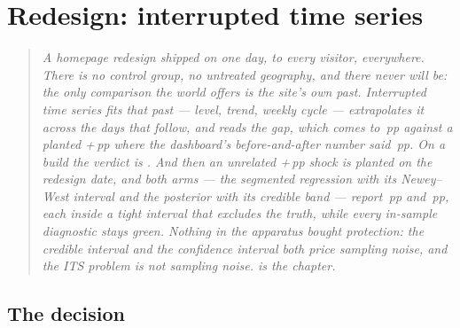 %
\providecommand{\pp}[1]{\mbox{#1\,pp}}

\chapter{Redesign: interrupted time series}
\label{ch:its}

\begin{quote}\small
\emph{A homepage redesign shipped on one day, to every visitor, everywhere. There is no control
group, no untreated geography, and there never will be: the only comparison the world offers is
the site's own past. Interrupted time series fits that past --- level, trend, weekly cycle ---
extrapolates it across the \nbTenNPost{} days that follow, and reads the gap, which comes to
\pp{\nbTenBayesAvg} against a planted \pp{+\nbTenTrueLift} where the dashboard's before-and-after
number said \pp{\nbTenNaive}. On a \eur{\nbTenCost} build the verdict is \nbTenPersVerdictnodecay{}.
And then an unrelated \pp{+\nbTenShock} shock is planted on the redesign date, and both arms ---
the segmented regression with its Newey--West interval and the posterior with its credible band ---
report \pp{\nbTenShockCls} and \pp{\nbTenShockBayes}, each inside a tight interval that
\emph{excludes} the truth, while every in-sample diagnostic stays green. Nothing in the apparatus
bought protection: the credible interval and the confidence interval both price sampling noise, and
the ITS problem is not sampling noise.  is the chapter.}
\end{quote}

\section{The decision}
\label{sec:its:decision}

